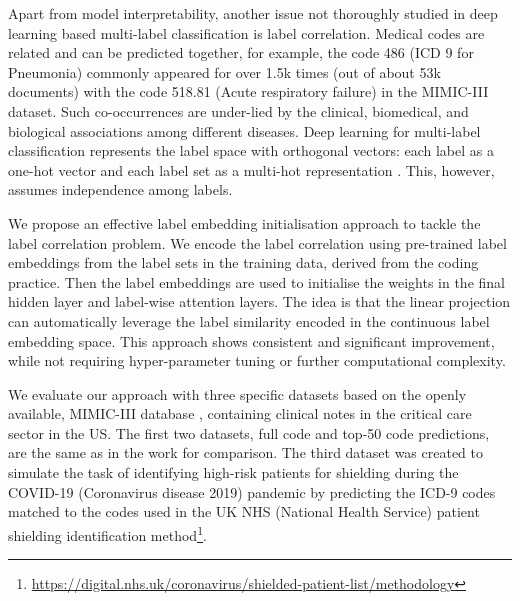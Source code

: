 \documentclass[final,5p,times,twocolumn]{elsarticle}
\begin{document}
Apart from model interpretability, another issue not thoroughly studied in deep learning based multi-label classification is label correlation. Medical codes are related and can be predicted together, for example, the code 486 (ICD 9 for Pneumonia) commonly appeared for over 1.5k times (out of about 53k documents) with the code 518.81 (Acute respiratory failure) in the MIMIC-III dataset. Such co-occurrences are under-lied by the clinical, biomedical, and biological associations among different diseases. Deep learning for multi-label classification represents the label space with orthogonal vectors: each label as a one-hot vector and each label set as a multi-hot representation \cite{Nam2014,mullenbach-etal-2018-explainable}. This, however, assumes independence among labels.

We propose an effective label embedding initialisation approach to tackle the label correlation problem. We encode the label correlation using pre-trained label embeddings from the label sets in the training data, derived from the coding practice. Then the label embeddings are used to initialise the weights in the final hidden layer and label-wise attention layers. The idea is that the linear projection can automatically leverage the label similarity encoded in the continuous label embedding space. This approach shows consistent and significant improvement, while not requiring hyper-parameter tuning or further computational complexity.

We evaluate our approach with three specific datasets based on the openly available, MIMIC-III database \cite{johnson_mimic-iii_2016}, containing clinical notes in the critical care sector in the US. The first two datasets, full code and top-50 code predictions, are the same as in the work \cite{mullenbach-etal-2018-explainable} for comparison. The third dataset was created to simulate the task of identifying high-risk patients for shielding during the COVID-19 (Coronavirus disease 2019) pandemic by predicting the ICD-9 codes matched to the codes used in the UK NHS (National Health Service) patient shielding identification method\footnote{\url{https://digital.nhs.uk/coronavirus/shielded-patient-list/methodology}}.
\end{document}
